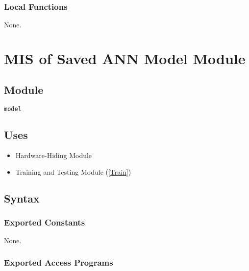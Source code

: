 \documentclass[12pt, titlepage]{article}
\def\code#1{\texttt{#1}}
\begin{document}


\subsubsection{Local Functions}
None.


\newpage

\section{MIS of Saved ANN Model Module} \label{SavedANN} 

\subsection{Module}
\code{model} 

\subsection{Uses}
\begin{itemize}
  \item Hardware-Hiding Module  
  \item Training and Testing Module (\ref{Train})
\end{itemize}


\subsection{Syntax}

\subsubsection{Exported Constants}
None.

\subsubsection{Exported Access Programs}
\end{document}
